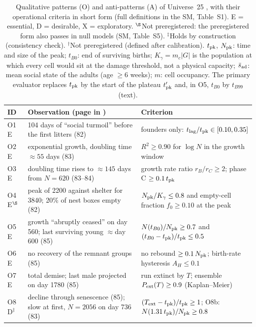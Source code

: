 \begin{table}[t]
\centering
\caption{Qualitative patterns (O) and anti-patterns (A) of Universe~25 \cite{Calhoun1973}, with their operational
criteria in short form (full definitions in the SM, Table~S1). E = essential, D = desirable, X = exploratory.
$^\S$Not preregistered: the preregistered form also passes in null models (SM, Table~S5).
$^\ddagger$Holds by construction (consistency check). $^\dagger$Not preregistered (defined after calibration).
$t_{\rm pk}$, $N_{\rm pk}$: time and size of the peak; $t_{B0}$: end of surviving births; $K_\gamma=m_c|G|$ is
the population at which every cell would sit at the damage threshold, not a physical capacity; $\bar s_{\rm ad}$:
mean social state of the adults (age $\ge6$ weeks); $m$: cell occupancy. The primary evaluator replaces
$t_{\rm pk}$ by the start of the plateau $t'_{\rm pk}$ and, in O5, $t_{B0}$ by $t_{B99}$ (text).}
\label{tab:observations}
\footnotesize
\setlength{\tabcolsep}{3pt}
\renewcommand{\arraystretch}{1.08}
\begin{tabular}{@{}p{1.0cm}p{7.3cm}p{8.6cm}@{}}
\toprule
ID & Observation (page in \cite{Calhoun1973}) & Criterion \\
\midrule
O1 E & 104 days of ``social turmoil'' before the first litters (82) & founders only: $t_{\rm lag}/t_{\rm pk}\in[0.10,0.35]$ \\
O2 E & exponential growth, doubling time ${\approx}55$ days (83) & $R^2\ge0.90$ for $\log N$ in the growth window \\
O3 E & doubling time rises to ${\approx}145$ days from $N=620$ (83--84) & growth rate ratio $r_B/r_C\ge2$; phase C $\ge0.1\,t_{\rm pk}$ \\
O4 E$^\S$ & peak of 2200 against shelter for 3840; 20\% of nest boxes empty (82) & $N_{\rm pk}/K_\gamma\le0.8$ and empty-cell fraction $f_0\ge0.10$ at the peak \\
O5 E & growth ``abruptly ceased'' on day 560; last surviving young ${\approx}$day 600 (85) & $N(t_{B0})/N_{\rm pk}\ge0.7$ and $(t_{B0}-t_{\rm pk})/t_{\rm pk}\le0.5$ \\
O6 E & no recovery of the remnant groups (85) & no rebound $\ge0.1\,N_{\rm pk}$; birth-rate hysteresis $A_H\le0.1$ \\
O7 E & total demise; last male projected on day 1780 (85) & run extinct by $T$; ensemble $P_{\rm ext}(T)\ge0.9$ (Kaplan--Meier) \\
O8 D$^\ddagger$ & decline through senescence (85); slow at first, $N=2056$ on day 736 (83) & $(T_{\rm ext}-t_{\rm pk})/t_{\rm pk}\ge1$; O8b: $N(1.31\,t_{\rm pk})/N_{\rm pk}\ge0.8$ \\

\end{tabular}
\end{table}
